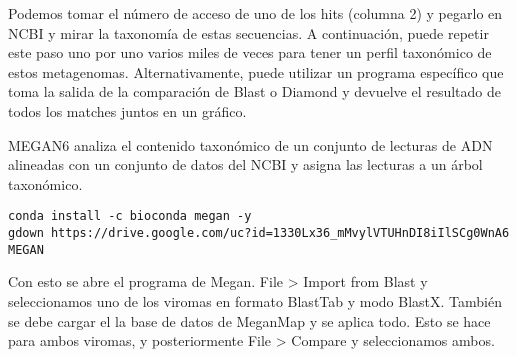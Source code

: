 Podemos tomar el número de acceso de uno de los hits (columna 2) y pegarlo en NCBI y mirar la taxonomía de estas secuencias. A continuación, puede repetir este paso uno por uno varios miles de veces para tener un perfil taxonómico de estos metagenomas. Alternativamente, puede utilizar un programa específico que toma la salida de la comparación de Blast o Diamond y devuelve el resultado de todos los matches juntos en un gráfico. 

MEGAN6 analiza el contenido taxonómico de un conjunto de lecturas de ADN alineadas con un conjunto de datos del NCBI y asigna las lecturas a un árbol taxonómico.
\begin{lstlisting}
conda install -c bioconda megan -y
gdown https://drive.google.com/uc?id=1330Lx36_mMvylVTUHnDI8iIlSCg0WnA6
MEGAN
\end{lstlisting}

Con esto se abre el programa de Megan. File > Import from Blast y seleccionamos uno de los viromas en formato BlastTab y modo BlastX. También se debe cargar el la base de datos de MeganMap y se aplica todo. Esto se hace para ambos viromas, y posteriormente File > Compare y seleccionamos ambos. 
